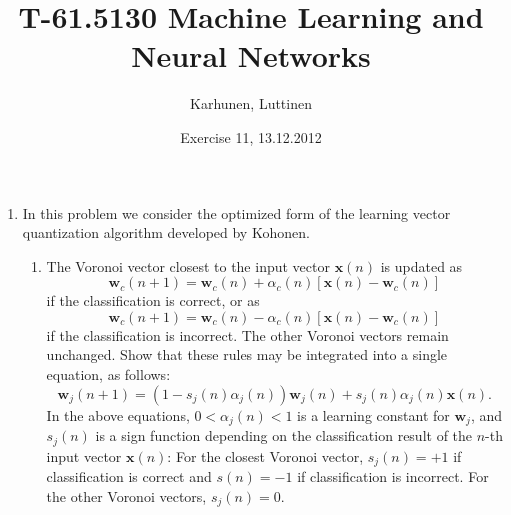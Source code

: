 
\title{T-61.5130 Machine Learning and Neural Networks}
\author{Karhunen, Luttinen}
\date{Exercise 11, 13.12.2012}

\newcommand{\vect}[1]{{\bf{#1}}}
\newcommand{\svect}[1]{\boldsymbol{#1}}
\newcommand{\matr}[1]{\boldsymbol{#1}}




\maketitle

\begin{enumerate}

\item In this problem we consider the optimized form of the learning
  vector quantization algorithm developed by Kohonen.
  \begin{enumerate}
  \item The Voronoi vector closest to the input vector $\mathbf{x}(n)$
    is updated as
    \begin{equation}
      \mathbf{w}_c(n+1)=\mathbf{w}_c(n)+\alpha_c(n)[\mathbf{x}(n)-\mathbf{w}_c(n)]
      \label{equation: 1}
    \end{equation}
    if the classification is correct, or as
    \begin{equation}
      \mathbf{w}_c(n+1)=\mathbf{w}_c(n)-\alpha_c(n)[\mathbf{x}(n)-\mathbf{w}_c(n)]
      \label{equation: 2}
    \end{equation}
    if the classification is incorrect.  The other Voronoi vectors
    remain unchanged.  Show that these rules may be integrated into a
    single equation, as follows:
    \begin{equation}
      \mathbf{w}_j(n+1) = (1-s_j(n)\alpha_j(n)) \mathbf{w}_j(n) + s_j(n)
      \alpha_j(n) \mathbf{x}(n).
      \label{equation: 3}
    \end{equation}
    In the above equations, $0<\alpha_j(n)<1$ is a learning constant
    for $\mathbf{w}_j$, and $s_j(n)$ is a sign function depending on
    the classification result of the $n$-th input vector
    $\mathbf{x}(n)$: For the closest Voronoi vector, $s_j(n)=+1$ if
    classification is correct and $s(n)=-1$ if classification is
    incorrect.  For the other Voronoi vectors, $s_j(n)=0$.


\end{enumerate}
\end{enumerate}
